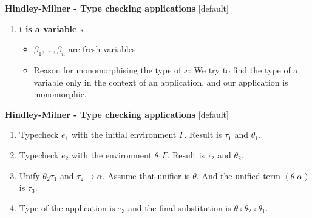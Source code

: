 \documentclass{beamer}
\begin{document}
\begin{frame}[fragile]{\bf Hindley-Milner - Type checking applications}
[default]
\begin{enumerate}[1:]
    \item t \textbf{is a variable} x
   
    \begin{itemize}
        \item $\beta_1 , \ldots , \beta_n$ are fresh variables.
        \item Reason for monomorphising the type of $x$: We try to find the type of a variable only in the context of an application, and our application is monomorphic.
    \end{itemize}
\end{enumerate}
       
\end{frame}

\begin{frame}[fragile]{\bf Hindley-Milner - Type checking applications}
[default]
\begin{enumerate}[1]
    \item Typecheck $e_1$ with the initial environment $\Gamma$. Result is $\tau_1$ and $\theta_1$.
    \item Typecheck $e_2$ with the environment $\theta_1\Gamma$. Result is $\tau_2$ and $\theta_2$.
    \item Unify $\theta_2 \tau_1$ and $\tau_2 \rightarrow \alpha$. Assume that unifier is $\theta$. And the unified term $(\theta \; \alpha)$ is $\tau_3$.
    \item Type of the application is $\tau_3$ and the final substitution is $\theta \circ \theta_2 \circ \theta_1$.
\end{enumerate}

\end{frame}
\end{document}
